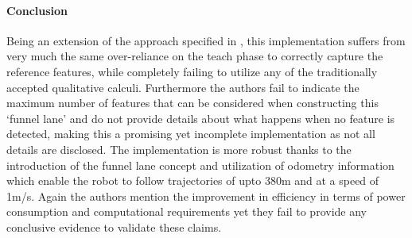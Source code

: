 \begin{itemize}
	\paragraph{Conclusion}Being an extension of the approach specified in \cite{chen2006qualitative}, this implementation suffers from very much the same over-reliance on the teach phase to correctly capture the reference features, while completely failing to utilize any of the traditionally accepted qualitative calculi. Furthermore the authors fail to indicate the maximum number of features that can be considered when constructing this `funnel lane' and do not provide details about what happens when no feature is detected, making this a promising yet incomplete implementation as not all details are disclosed. The implementation is more robust thanks to the introduction of the funnel lane concept and utilization of odometry information which enable the robot to follow trajectories of upto 380m and at a speed of 1m/s. Again the authors mention the improvement in efficiency in terms of power consumption and computational requirements yet they fail to provide any conclusive evidence to validate these claims. 
	

\end{itemize}
